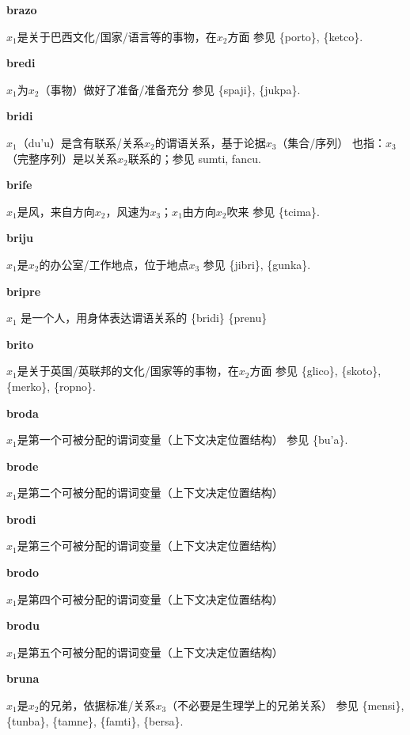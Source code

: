 \documentclass[notitlepage,twocolumn,a4paper,10pt]{book}
\begin{document}
{\sffamily\bfseries brazo}\enspace {\ttfamily\bfseries[raz]}  $x_1$是关于巴西文化\slash{}国家\slash{}语言等的事物，在$x_2$方面 \textemdash{} 参见 \{porto\}, \{ketco\}.

{\sffamily\bfseries bredi}  $x_1$为$x_2$（事物）做好了准备\slash{}准备充分 \textemdash{} 参见 \{spaji\}, \{jukpa\}.

{\sffamily\bfseries bridi}\enspace {\ttfamily\bfseries[    bri]}  $x_1$（du'u）是含有联系\slash{}关系$x_2$的谓语关系，基于论据$x_3$（集合\slash{}序列） \textemdash{} 也指：$x_3$（完整序列）是以关系$x_2$联系的；参见 {sumti}, {fancu}.

{\sffamily\bfseries brife}\enspace {\ttfamily\bfseries[bif     bi'e]}  $x_1$是风，来自方向$x_2$，风速为$x_3$；$x_1$由方向$x_2$吹来 \textemdash{} 参见 \{tcima\}.

{\sffamily\bfseries briju}\enspace {\ttfamily\bfseries[bij]}  $x_1$是$x_2$的办公室\slash{}工作地点，位于地点$x_3$ \textemdash{} 参见 \{jibri\}, \{gunka\}.

{\sffamily\bfseries bripre} $x_1$ 是一个人，用身体表达谓语关系的 \textemdash{} \{bridi\} \{prenu\}

{\sffamily\bfseries brito}\enspace {\ttfamily\bfseries[rit]}  $x_1$是关于英国\slash{}英联邦的文化\slash{}国家等的事物，在$x_2$方面 \textemdash{} 参见 \{glico\}, \{skoto\}, \{merko\}, \{ropno\}.

{\sffamily\bfseries broda}\enspace {\ttfamily\bfseries[rod]}  $x_1$是第一个可被分配的谓词变量（上下文决定位置结构） \textemdash{} 参见 \{bu'a\}.

{\sffamily\bfseries brode}\enspace {\ttfamily\bfseries[        bo'e]}  $x_1$是第二个可被分配的谓词变量（上下文决定位置结构）

{\sffamily\bfseries brodi} $x_1$是第三个可被分配的谓词变量（上下文决定位置结构）

{\sffamily\bfseries brodo} $x_1$是第四个可被分配的谓词变量（上下文决定位置结构）

{\sffamily\bfseries brodu} $x_1$是第五个可被分配的谓词变量（上下文决定位置结构）

{\sffamily\bfseries bruna}\enspace {\ttfamily\bfseries[bun     bu'a]}  $x_1$是$x_2$的兄弟，依据标准\slash{}关系$x_3$（不必要是生理学上的兄弟关系） \textemdash{} 参见 \{mensi\}, \{tunba\}, \{tamne\}, \{famti\}, \{bersa\}.
\end{document}
